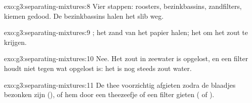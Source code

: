 \begin{solution}{exo:g3:separating-mixtures:8}
Vier stappen: roosters, bezinkbassins, zandfilters, kiemen gedood. De
bezinkbassins halen het slib weg.
\end{solution}

\begin{solution}{exo:g3:separating-mixtures:9}
; het zand van het papier halen; het   om het
zout te krijgen.
\end{solution}

\begin{solution}{exo:g3:separating-mixtures:10}
Nee. Het zout in zeewater is opgelost, en een filter houdt niet tegen wat
opgelost is: het  is nog steeds zout water.
\end{solution}

\begin{solution}{exo:g3:separating-mixtures:11}
De thee voorzichtig afgieten zodra de blaadjes bezonken zijn
(), of hem door een theezeefje of een filter gieten ( of
).
\end{solution}
